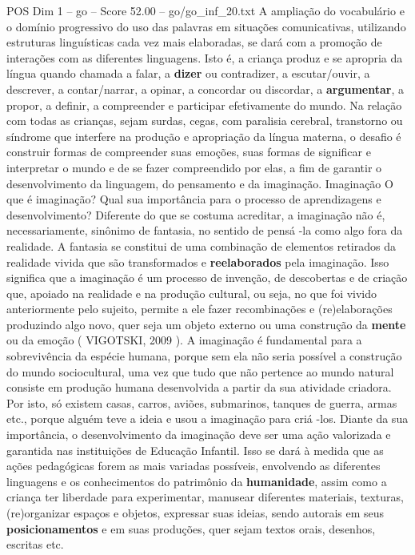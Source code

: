\begin{textsample}{POS Dim 1 – go – Score 52.00 – go/go\_inf\_20.txt}
A ampliação do vocabulário e o domínio progressivo do uso das palavras em situações comunicativas, utilizando estruturas linguísticas cada vez mais elaboradas, se dará com a promoção de interações com as diferentes linguagens.
Isto é, a criança produz e se apropria da língua quando chamada a falar, a \textbf{dizer} ou contradizer, a escutar/ouvir, a descrever, a contar/narrar, a opinar, a concordar ou discordar, a \textbf{argumentar}, a propor, a definir, a compreender e participar efetivamente do mundo.
Na relação com todas as crianças, sejam surdas, cegas, com paralisia cerebral, transtorno ou síndrome que interfere na produção e apropriação da língua materna, o desafio é construir formas de compreender suas emoções, suas formas de significar e interpretar o mundo e de se fazer compreendido por elas, a fim de garantir o desenvolvimento da linguagem, do pensamento e da imaginação.
Imaginação O que é imaginação?
Qual sua importância para o processo de aprendizagens e desenvolvimento?
Diferente do que se costuma acreditar, a imaginação não é, necessariamente, sinônimo de fantasia, no sentido de pensá -la como algo fora da realidade.
A fantasia se constitui de uma combinação de elementos retirados da realidade vivida que são transformados e \textbf{reelaborados} pela imaginação.
Isso significa que a imaginação é um processo de invenção, de descobertas e de criação que, apoiado na realidade e na produção cultural, ou seja, no que foi vivido anteriormente pelo sujeito, permite a ele fazer recombinações e (re)elaborações produzindo algo novo, quer seja um objeto externo ou uma construção da \textbf{mente} ou da emoção ( VIGOTSKI, 2009 ).
A imaginação é fundamental para a sobrevivência da espécie humana, porque sem ela não seria possível a construção do mundo sociocultural, uma vez que tudo que não pertence ao mundo natural consiste em produção humana desenvolvida a partir da sua atividade criadora.
Por isto, só existem casas, carros, aviões, submarinos, tanques de guerra, armas etc., porque alguém teve a ideia e usou a imaginação para criá -los.
Diante da sua importância, o desenvolvimento da imaginação deve ser uma ação valorizada e garantida nas instituições de Educação Infantil.
Isso se dará à medida que as ações pedagógicas forem as mais variadas possíveis, envolvendo as diferentes linguagens e os conhecimentos do patrimônio da \textbf{humanidade}, assim como a criança ter liberdade para experimentar, manusear diferentes materiais, texturas, (re)organizar espaços e objetos, expressar suas ideias, sendo autorais em seus \textbf{posicionamentos} e em suas produções, quer sejam textos orais, desenhos, escritas etc.

\end{textsample}
